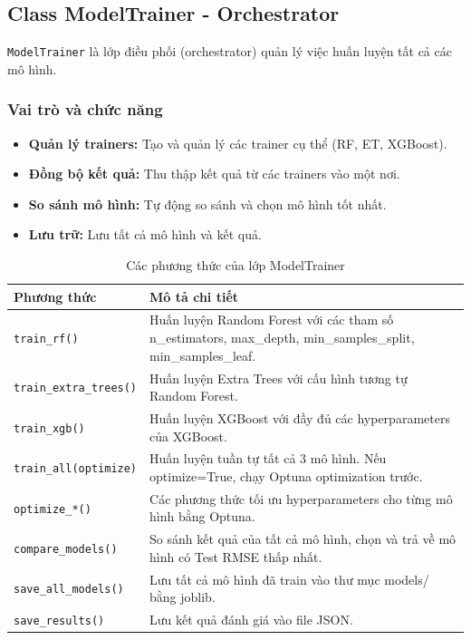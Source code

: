 \documentclass[12pt,a4paper]{article}
\begin{document}
\subsection{Class ModelTrainer - Orchestrator}

\texttt{ModelTrainer} là lớp điều phối (orchestrator) quản lý việc huấn luyện tất cả các mô hình.

\subsubsection{Vai trò và chức năng}

\begin{itemize}
    \item \textbf{Quản lý trainers:} Tạo và quản lý các trainer cụ thể (RF, ET, XGBoost).
    \item \textbf{Đồng bộ kết quả:} Thu thập kết quả từ các trainers vào một nơi.
    \item \textbf{So sánh mô hình:} Tự động so sánh và chọn mô hình tốt nhất.
    \item \textbf{Lưu trữ:} Lưu tất cả mô hình và kết quả.
\end{itemize}

\begin{table}[H]
\centering
\caption{Các phương thức của lớp ModelTrainer}
\label{tab:modeltrainer_methods}
\begin{tabular}{|p{4cm}|p{9.5cm}|}
\hline
\textbf{Phương thức} & \textbf{Mô tả chi tiết} \\
\hline
\texttt{train\_rf()} & Huấn luyện Random Forest với các tham số n\_estimators, max\_depth, min\_samples\_split, min\_samples\_leaf. \\
\hline
\texttt{train\_extra\_trees()} & Huấn luyện Extra Trees với cấu hình tương tự Random Forest. \\
\hline
\texttt{train\_xgb()} & Huấn luyện XGBoost với đầy đủ các hyperparameters của XGBoost. \\
\hline
\texttt{train\_all(optimize)} & Huấn luyện tuần tự tất cả 3 mô hình. Nếu optimize=True, chạy Optuna optimization trước. \\
\hline
\texttt{optimize\_*()} & Các phương thức tối ưu hyperparameters cho từng mô hình bằng Optuna. \\
\hline
\texttt{compare\_models()} & So sánh kết quả của tất cả mô hình, chọn và trả về mô hình có Test RMSE thấp nhất. \\
\hline
\texttt{save\_all\_models()} & Lưu tất cả mô hình đã train vào thư mục models/ bằng joblib. \\
\hline
\texttt{save\_results()} & Lưu kết quả đánh giá vào file JSON. \\
\hline
\end{tabular}
\end{table}
\end{document}
